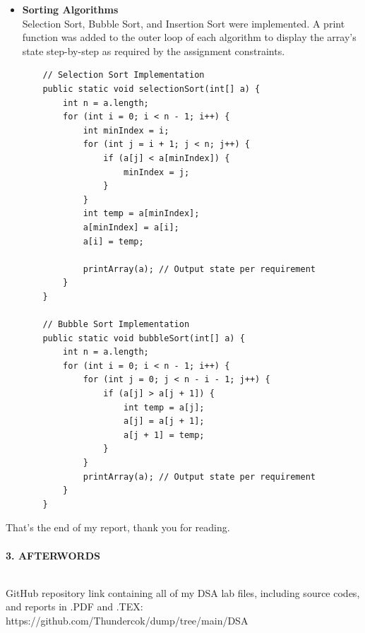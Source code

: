 \documentclass[12pt]{article}
\begin{document}
\begin{itemize}
\item[\textbf{Exercise 4. }] \textbf{Sorting Algorithms} \\
Selection Sort, Bubble Sort, and Insertion Sort were implemented. A print function was added to the outer loop of each algorithm to display the array's state step-by-step as required by the assignment constraints.
\begin{verbatim}
    // Selection Sort Implementation
    public static void selectionSort(int[] a) {
        int n = a.length;
        for (int i = 0; i < n - 1; i++) {
            int minIndex = i;
            for (int j = i + 1; j < n; j++) {
                if (a[j] < a[minIndex]) {
                    minIndex = j;
                }
            }
            int temp = a[minIndex];
            a[minIndex] = a[i];
            a[i] = temp;
            
            printArray(a); // Output state per requirement
        }
    }

    // Bubble Sort Implementation
    public static void bubbleSort(int[] a) {
        int n = a.length;
        for (int i = 0; i < n - 1; i++) {
            for (int j = 0; j < n - i - 1; j++) {
                if (a[j] > a[j + 1]) {
                    int temp = a[j];
                    a[j] = a[j + 1];
                    a[j + 1] = temp;
                }
            }
            printArray(a); // Output state per requirement
        }
    }
\end{verbatim}

\end{itemize}

That's the end of my report, thank you for reading. \\\\
\textbf{3. AFTERWORDS}\\\\

\centering
\vspace{20pt}

GitHub repository link containing all of my DSA lab files, including source codes, \\ and reports in .PDF and .TEX:\\ https://github.com/Thundercok/dump/tree/main/DSA
\end{document}
